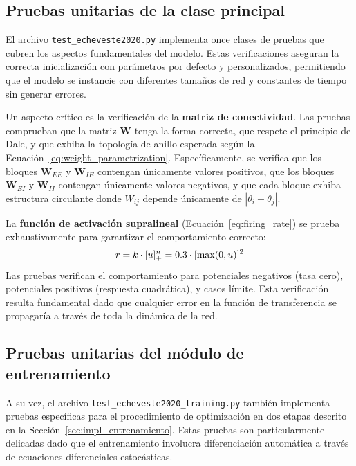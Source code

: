 \subsection{Pruebas unitarias de la clase principal}
\label{subsec:res_tests_main}

El archivo \texttt{test\_echeveste2020.py} implementa once clases de pruebas que cubren los aspectos fundamentales del modelo. Estas verificaciones aseguran la correcta inicialización con parámetros por defecto y personalizados, permitiendo que el modelo se instancie con diferentes tamaños de red y constantes de tiempo sin generar errores.

Un aspecto crítico es la verificación de la \textbf{matriz de conectividad}. Las pruebas comprueban que la matriz $\mathbf{W}$ tenga la forma correcta, que respete el principio de Dale, y que exhiba la topología de anillo esperada según la Ecuación~\ref{eq:weight_parametrization}. Específicamente, se verifica que los bloques $\mathbf{W}_{EE}$ y $\mathbf{W}_{IE}$ contengan únicamente valores positivos, que los bloques $\mathbf{W}_{EI}$ y $\mathbf{W}_{II}$ contengan únicamente valores negativos, y que cada bloque exhiba estructura circulante donde $W_{ij}$ depende únicamente de $|\theta_i - \theta_j|$.

La \textbf{función de activación supralineal} (Ecuación~\ref{eq:firing_rate}) se prueba exhaustivamente para garantizar el comportamiento correcto:
\begin{equation} \notag
r = k \cdot [u]_+^n = 0.3 \cdot [\max(0, u)]^2
\label{eq:firing_rate_test}
\end{equation}
Las pruebas verifican el comportamiento para potenciales negativos (tasa cero), potenciales positivos (respuesta cuadrática), y casos límite. Esta verificación resulta fundamental dado que cualquier error en la función de transferencia se propagaría a través de toda la dinámica de la red.

\subsection{Pruebas unitarias del módulo de entrenamiento}
\label{subsec:res_tests_training}

A su vez, el archivo \texttt{test\_echeveste2020\_training.py} también implementa pruebas específicas para el procedimiento de optimización en dos etapas descrito en la Sección~\ref{sec:impl_entrenamiento}. Estas pruebas son particularmente delicadas dado que el entrenamiento involucra diferenciación automática a través de ecuaciones diferenciales estocásticas.

